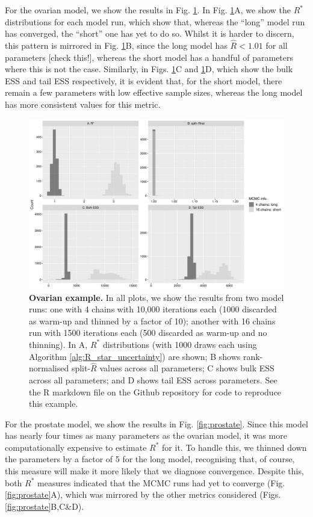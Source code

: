 \documentclass{article}
\begin{document}
For the ovarian model, we show the results in Fig. \ref{fig:ovarian}. In Fig. \ref{fig:ovarian}A, we show the $R^*$ distributions for each model run, which show that, whereas the ``long'' model run has converged, the ``short'' one has yet to do so. Whilst it is harder to discern, this pattern is mirrored in Fig. \ref{fig:ovarian}B, since the long model has $\widehat{R}<1.01$ for all parameters [check this!], whereas the short model has a handful of parameters where this is not the case. Similarly, in Figs. \ref{fig:ovarian}C and \ref{fig:ovarian}D, which show the bulk ESS and tail ESS respectively, it is evident that, for the short model, there remain a few parameters with low effective sample sizes, whereas the long model has more consistent values for this metric.

\begin{figure}[!htb]
	\centerline{\includegraphics[width=1.0\textwidth]{../output/ovarian.pdf}}
	\caption{\textbf{Ovarian example.} In all plots, we show the results from two model runs: one with 4 chains with 10,000 iterations each (1000 discarded as warm-up and thinned by a factor of 10); another with 16 chains run with 1500 iterations each (500 discarded as warm-up and no thinning). In A, $R^*$ distributions (with 1000 draws each using Algorithm \ref{alg:R_star_uncertainty}) are shown; B shows rank-normalised split-$\widehat{R}$ values across all parameters; C shows bulk ESS across all parameters; and D shows tail ESS across parameters. See the R markdown file on the Github repository for code to reproduce this example.}
	\label{fig:ovarian}
\end{figure}

For the prostate model, we show the results in Fig. \ref{fig:prostate}. Since this model has nearly four times as many parameters as the ovarian model, it was more computationally expensive to estimate $R^*$ for it. To handle this, we thinned down the parameters by a factor of 5 for the long model, recognising that, of course, this measure will make it more likely that we diagnose convergence. Despite this, both $R^*$ measures indicated that the MCMC runs had yet to converge (Fig. \ref{fig:prostate}A), which was mirrored by the other metrics considered (Figs. \ref{fig:prostate}B,C\&D).
\end{document}
